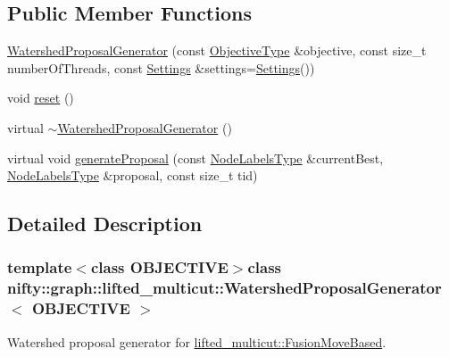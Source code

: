 \subsection*{Public Member Functions}
\begin{DoxyCompactItemize}
\item 
\hyperlink{classnifty_1_1graph_1_1lifted__multicut_1_1WatershedProposalGenerator_ac48e7b472b49520d331d345b378d9a36}{Watershed\+Proposal\+Generator} (const \hyperlink{classnifty_1_1graph_1_1lifted__multicut_1_1WatershedProposalGenerator_ad2f66e9e201ceb041cb2fe5af7be8ed2}{Objective\+Type} \&objective, const size\+\_\+t number\+Of\+Threads, const \hyperlink{structnifty_1_1graph_1_1lifted__multicut_1_1WatershedProposalGenerator_1_1Settings}{Settings} \&settings=\hyperlink{structnifty_1_1graph_1_1lifted__multicut_1_1WatershedProposalGenerator_1_1Settings}{Settings}())
\item 
void \hyperlink{classnifty_1_1graph_1_1lifted__multicut_1_1WatershedProposalGenerator_a582c59dc7920551c20c19b6131a92eb4}{reset} ()
\item 
virtual \hyperlink{classnifty_1_1graph_1_1lifted__multicut_1_1WatershedProposalGenerator_aeb6a418aad43bfb391512614e2416857}{$\sim$\+Watershed\+Proposal\+Generator} ()
\item 
virtual void \hyperlink{classnifty_1_1graph_1_1lifted__multicut_1_1WatershedProposalGenerator_ac0ec07df6e2cf390c896fef028a72805}{generate\+Proposal} (const \hyperlink{classnifty_1_1graph_1_1lifted__multicut_1_1ProposalGeneratorBase_a15a73233a0b101c39e89b46e9b2cfa7a}{Node\+Labels\+Type} \&current\+Best, \hyperlink{classnifty_1_1graph_1_1lifted__multicut_1_1ProposalGeneratorBase_a15a73233a0b101c39e89b46e9b2cfa7a}{Node\+Labels\+Type} \&proposal, const size\+\_\+t tid)
\end{DoxyCompactItemize}


\subsection{Detailed Description}
\subsubsection*{template$<$class O\+B\+J\+E\+C\+T\+I\+V\+E$>$class nifty\+::graph\+::lifted\+\_\+multicut\+::\+Watershed\+Proposal\+Generator$<$ O\+B\+J\+E\+C\+T\+I\+V\+E $>$}

Watershed proposal generator for \hyperlink{classnifty_1_1graph_1_1lifted__multicut_1_1FusionMoveBased}{lifted\+\_\+multicut\+::\+Fusion\+Move\+Based}. 


